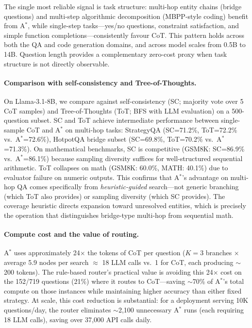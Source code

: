 \documentclass{article}
\newcommand{\astar}{A$^*$\xspace}
\begin{document}
The single most reliable signal is task structure: multi-hop entity chains (bridge questions) and multi-step algorithmic decomposition (MBPP-style coding) benefit from \astar, while single-step tasks---yes/no questions, constraint satisfaction, and simple function completions---consistently favour CoT. This pattern holds across both the QA and code generation domains, and across model scales from 0.5B to 14B. Question length provides a complementary zero-cost proxy when task structure is not directly observable.

\paragraph{Comparison with self-consistency and Tree-of-Thoughts.}
On Llama-3.1-8B, we compare against self-consistency (SC; majority vote over 5 CoT samples) and Tree-of-Thoughts (ToT; BFS with LLM evaluation) on a 500-question subset. SC and ToT achieve intermediate performance between single-sample CoT and \astar on multi-hop tasks: StrategyQA (SC=71.2\%, ToT=72.2\% vs.\ \astar=72.6\%), HotpotQA bridge subset (SC=69.8\%, ToT=70.2\% vs.\ \astar=71.3\%). On mathematical benchmarks, SC is competitive (GSM8K: SC=86.9\% vs.\ \astar=86.1\%) because sampling diversity suffices for well-structured sequential arithmetic. ToT collapses on math (GSM8K: 60.0\%, MATH: 40.1\%) due to evaluator failure on numeric outputs. This confirms that \astar's advantage on multi-hop QA comes specifically from \emph{heuristic-guided} search---not generic branching (which ToT also provides) or sampling diversity (which SC provides). The coverage heuristic directs expansion toward unresolved entities, which is precisely the operation that distinguishes bridge-type multi-hop from sequential math.

\paragraph{Compute cost and the value of routing.}
\astar uses approximately 24$\times$ the tokens of CoT per question ($K=3$ branches $\times$ average 5.9 nodes per search $\approx$ 18 LLM calls vs.\ 1 for CoT, each producing $\sim$200 tokens). The rule-based router's practical value is avoiding this 24$\times$ cost on the 152/719 questions (21\%) where it routes to CoT---saving $\sim$70\% of \astar's total compute on those instances while maintaining higher accuracy than either fixed strategy. At scale, this cost reduction is substantial: for a deployment serving 10K questions/day, the router eliminates $\sim$2,100 unnecessary \astar runs (each requiring 18 LLM calls), saving over 37,000 API calls daily.
\end{document}
